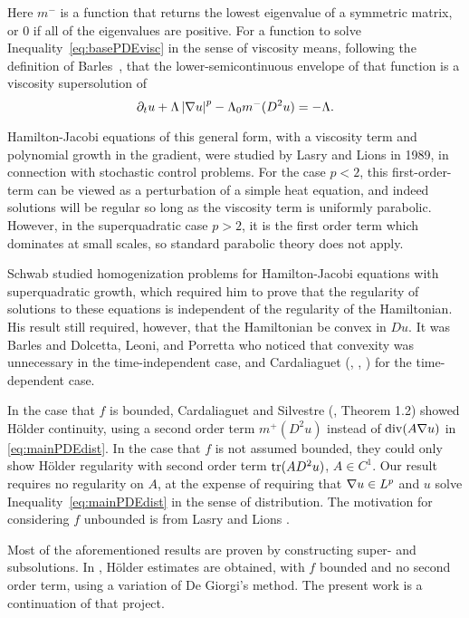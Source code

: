 Here $m^-$ is a function that returns the lowest eigenvalue of a symmetric matrix, or 0 if all of the eigenvalues are positive.  For a function to solve Inequality~\eqref{eq:basePDEvisc} in the sense of viscosity means, following the definition of Barles~\cite{Ba.viscosity}, that the lower-semicontinuous envelope of that function is a viscosity supersolution of 
\[ \partial_t u + \Lambda \left\lvert \nabla u \right\rvert^p - \Lambda_0 m^-(D^2 u) = -\Lambda. \]

Hamilton-Jacobi equations of this general form, with a viscosity term and polynomial growth in the gradient, were studied by Lasry and Lions \cite{LaLi.nonlinear} in 1989, in connection with stochastic control problems.  For the case $p < 2$, this first-order-term can be viewed as a perturbation of a simple heat equation, and indeed solutions will be regular so long as the viscosity term is uniformly parabolic.  However, in the superquadratic case $p > 2$, it is the first order term which dominates at small scales, so standard parabolic theory does not apply.  

Schwab \cite{Sc} studied homogenization problems for Hamilton-Jacobi equations with superquadratic growth, which required him to prove that the regularity of solutions to these equations is independent of the regularity of the Hamiltonian.  His result still required, however, that the Hamiltonian be convex in $Du$.  It was Barles \cite{Ba.hamjac} and Dolcetta, Leoni, and Porretta \cite{DoLePo} who noticed that convexity was unnecessary in the time-independent case, and Cardaliaguet (\cite{Ca}, \cite{CaCa}, \cite{CaSi.hamjac}) for the time-dependent case.  

In the case that $f$ is bounded, Cardaliaguet and Silvestre (\cite{CaSi.hamjac}, Theorem 1.2) showed H\"{o}lder continuity, using a second order term $m^+(D^2 u)$ instead of $\operatorname{div}(A \nabla u)$ in \eqref{eq:mainPDEdist}.  In the case that $f$ is not assumed bounded, they could only show H\"{o}lder regularity with second order term $\operatorname{tr}(A D^2 u)$, $A \in C^1$.  Our result requires no regularity on $A$, at the expense of requiring that $\nabla u \in L^p$ and $u$ solve Inequality~\eqref{eq:mainPDEdist} in the sense of distribution.  The motivation for considering $f$ unbounded is from Lasry and Lions \cite{LaLi.meanfield}.  

Most of the aforementioned results are proven by constructing super- and subsolutions.  In \cite{ChVa}, H\"{o}lder estimates are obtained, with $f$ bounded and no second order term, using a variation of De Giorgi's method.  The present work is a continuation of that project.  


